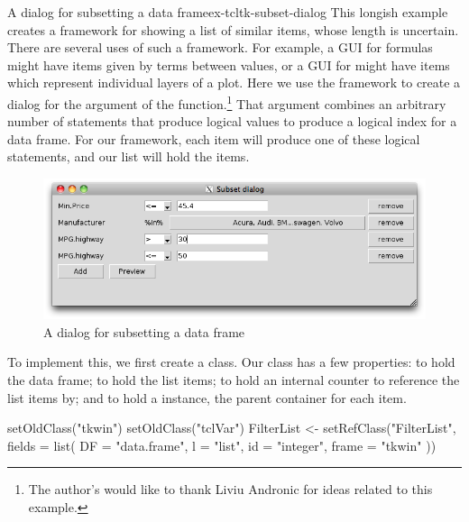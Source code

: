\begin{example}{A dialog for subsetting a data frame}{ex-tcltk-subset-dialog}
%
%
This longish example creates a framework for showing a list of similar
items, whose length is uncertain. There are several uses of such a framework. For example, a GUI
for formulas might have items given by terms between \code{+} values,
or a GUI for  might have items which represent individual
layers of a plot. Here we use the framework to create a dialog for the
 argument of the 
function.\footnote{The author's would like to thank Liviu Andronic for
  ideas related to this example.} That argument
combines an arbitrary number of statements that produce logical values
to produce a logical index for a data frame. For our framework, each
item will produce one of these logical statements, and our list will
hold the items.
%
\begin{figure}
  \centering
  \includegraphics[width = .8\textwidth]{fig-tcltk-subset-filter.png}
  \caption{A dialog for subsetting a data frame}
  \label{fig:tcltk-subset-filter}
\end{figure}
%

To implement this, we first create a  class. Our
class has a few properties:  to hold the data frame; 
to hold the list items;  to hold an internal counter to
reference the list items by; and  to hold a
 instance, the parent container for each item.

\begin{Schunk}
\begin{Sinput}
 setOldClass("tkwin")
 setOldClass("tclVar")
 FilterList <- setRefClass("FilterList",
                           fields = list(
                             DF = "data.frame",
                             l = "list",
                             id = "integer",
                             frame = "tkwin" 
                             ))
\end{Sinput}
\end{Schunk}


\end{example}
